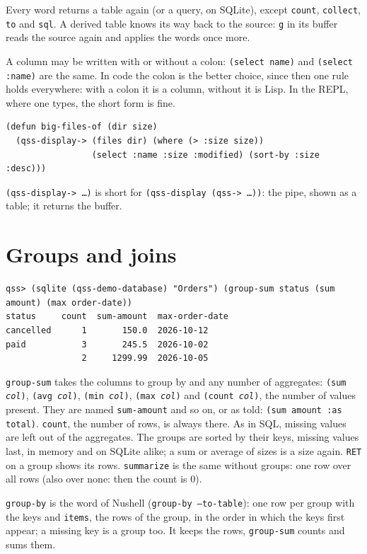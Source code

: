 \documentclass[
  paper=a4, fontsize=11pt, parskip=half, headings=small,
  toc=bibliography, numbers=noenddot, DIV=12
]{scrreprt}
\newcommand{\code}[1]{\texttt{#1}}
\newcommand{\kbd}[1]{\texttt{#1}}
\begin{document}
Every word returns a table again (or a query, on SQLite), except
\code{count}, \code{collect}, \code{to} and \code{sql}. A derived table knows
its way back to the source: \kbd{g} in its buffer reads the source again and
applies the words once more.

A column may be written with or without a colon: \code{(select name)} and
\code{(select :name)} are the same. In code the colon is the better choice,
since then one rule holds everywhere: with a colon it is a column, without it is
Lisp. In the REPL, where one types, the short form is fine.

\begin{lstlisting}
(defun big-files-of (dir size)
  (qss-display-> (files dir) (where (> :size size))
                 (select :name :size :modified) (sort-by :size :desc)))
\end{lstlisting}

\code{(qss-display-> \ldots)} is short for \code{(qss-display (qss-> \ldots))}:
the pipe, shown as a table; it returns the buffer.

\section{Groups and joins}

\begin{Verbatim}
qss> (sqlite (qss-demo-database) "Orders") (group-sum status (sum amount) (max order-date))
status     count  sum-amount  max-order-date
cancelled      1       150.0  2026-10-12
paid           3       245.5  2026-10-02
               2     1299.99  2026-10-05
\end{Verbatim}

\code{group-sum} takes the columns to group by and any number of aggregates:
\code{(sum \emph{col})}, \code{(avg \emph{col})}, \code{(min \emph{col})},
\code{(max \emph{col})} and \code{(count \emph{col})}, the number of values
present. They are named \code{sum-amount} and so on, or as told:
\code{(sum amount :as total)}. \code{count}, the number of rows, is always
there. As in SQL, missing values are left out of the aggregates. The groups are
sorted by their keys, missing values last, in memory and on SQLite alike; a sum
or average of sizes is a size again. \kbd{RET} on a group shows its rows.
\code{summarize} is the same without groups: one row over all rows (also over
none: then the count is 0).

\code{group-by} is the word of Nushell (\code{group-by --to-table}): one row per
group with the keys and \code{items}, the rows of the group, in the order in
which the keys first appear; a missing key is a group too. It keeps the rows,
\code{group-sum} counts and sums them.
\end{document}

